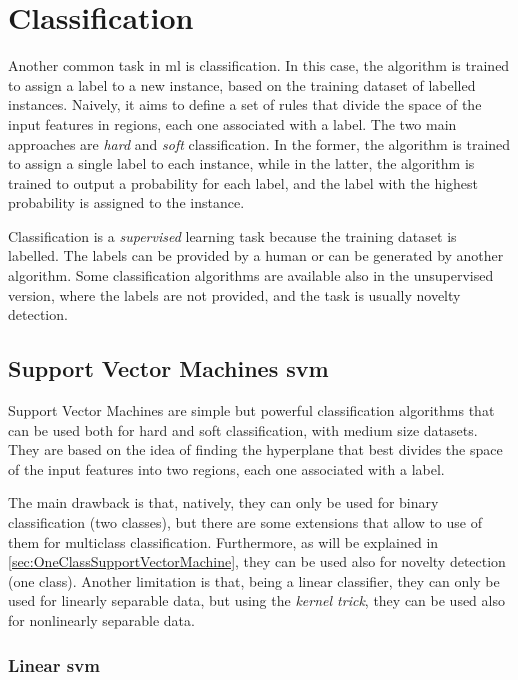 \section{Classification}
\label{sec:Classification}
Another common task in \gls{ml} is classification. In this case, the algorithm is trained to assign a label to a new instance, based on the training dataset of labelled instances. Naively, it aims to define a set of rules that divide the space of the input features in regions, each one associated with a label. The two main approaches are \emph{hard} and \emph{soft} classification. In the former, the algorithm is trained to assign a single label to each instance, while in the latter, the algorithm is trained to output a probability for each label, and the label with the highest probability is assigned to the instance.

Classification is a \emph{supervised} learning task because the training dataset is labelled. The labels can be provided by a human or can be generated by another algorithm. Some classification algorithms are available also in the unsupervised version, where the labels are not provided, and the task is usually novelty detection.

\subsection{Support Vector Machines \gls{svm}}
\label{subsec:svm}
Support Vector Machines are simple but powerful classification algorithms that can be used both for hard and soft classification, with medium size datasets. They are based on the idea of finding the hyperplane that best divides the space of the input features into two regions, each one associated with a label.

The main drawback is that, natively, they can only be used for binary classification (two classes), but there are some extensions that allow to use of them for multiclass classification. Furthermore, as will be explained in \autoref{sec:OneClassSupportVectorMachine}, they can be used also for novelty detection (one class). Another limitation is that, being a linear classifier, they can only be used for linearly separable data, but using the \emph{kernel trick}, they can be used also for nonlinearly separable data.

\subsubsection{Linear \gls{svm}}
\label{subsubsec:LinearSVM}

